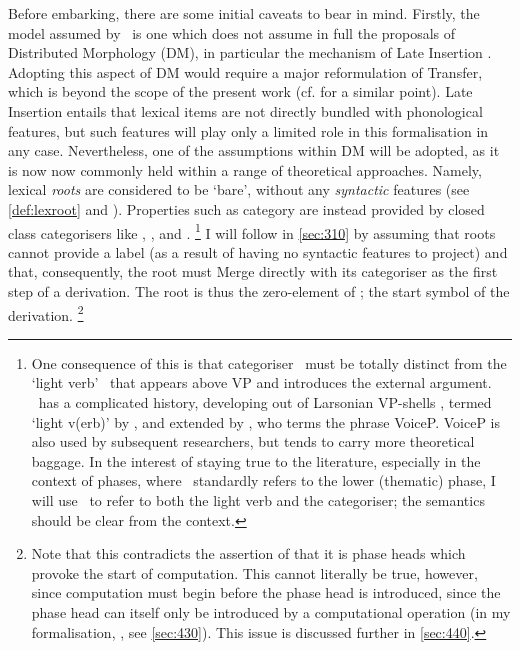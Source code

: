 Before embarking, there are some initial caveats to bear in mind. Firstly, the model assumed by \CS\ is one which does not assume in full the proposals of Distributed Morphology (DM), in particular the mechanism of Late Insertion \parencite{HalleM.MarantzA_1993}. Adopting this aspect of DM would require a major reformulation of Transfer, which is beyond the scope of the present work (cf.  for a similar point). Late Insertion entails that lexical items are not directly bundled with phonological features, but such features will play only a limited role in this formalisation in any case. Nevertheless, one of the assumptions within DM will be adopted, as it is now now commonly held within a range of theoretical approaches. Namely, lexical \emph{roots} are considered to be `bare', without any \emph{syntactic} features (see \autoref{def:lexroot} and ). Properties such as category are instead provided by closed class categorisers like \littleN, \littleV, and \littleA.%
\footnote{\label{fn:littleV}One consequence of this is that categoriser \littleV\ must be totally distinct from the `light verb' \littleV\ that appears above VP and introduces the external argument. \littleVP\ has a complicated history, developing out of Larsonian VP-shells \parencite{LarsonRK_1988}, termed `light v(erb)' by \textcite[315-316]{ChomskyN_1995}, and extended by \textcite{KratzerA_1996}, who terms the phrase VoiceP. VoiceP is also used by subsequent researchers, but tends to carry more theoretical baggage. In the interest of staying true to the literature, especially in the context of phases, where \littleVP\ standardly refers to the lower (thematic) phase, I will use \littleV\ to refer to both the light verb and the categoriser; the semantics should be clear from the context.}
I will follow \textcite{ChomskyN_2015} in \autoref{sec:310} by assuming that roots cannot provide a label (as a result of having no syntactic features to project) and that, consequently, the root must Merge directly with its categoriser as the first step of a derivation. The root is thus the zero-element of \textcite{WatumullJ_2015}; the start symbol of the derivation.%
\footnote{Note that this contradicts the assertion of \textcite[7]{AdgerD.RobertsI_} that it is phase heads which provoke the start of computation. This cannot literally be true, however, since computation must begin before the phase head is introduced, since the phase head can itself only be introduced by a computational operation (in my formalisation, \Select, see \autoref{sec:430}). This issue is discussed further in \autoref{sec:440}.}

